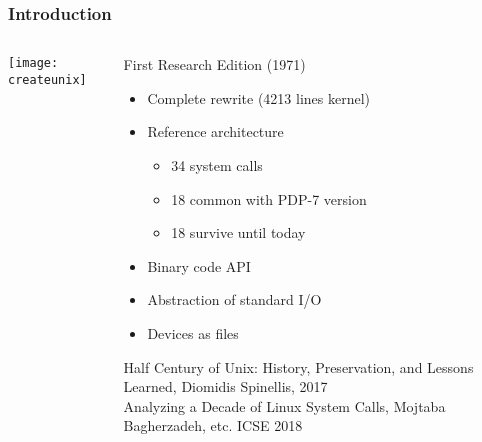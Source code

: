 \begin{frame}[plain]
	\frametitle{Introduction}
	
	
	
	\begin{columns}
		
		\begin{column}{.4\textwidth}
			
			\texttt{[image: createunix]}
			
		\end{column}
		
		\begin{column}{.6\textwidth}

		First Research Edition (1971)
		\begin{itemize}
			\item Complete rewrite (4213 lines kernel)
			\item Reference architecture
			
			\begin{itemize}
				\item 34 system calls
				\item 18 common with PDP-7 version
				\item 18 survive until today				
			\end{itemize}
			
			\item Binary code API
			\item Abstraction of standard I/O
			\item Devices as files
			
		\end{itemize}

	\begin{flushleft}
	\tiny Half Century of Unix:	History, Preservation, and	Lessons Learned, Diomidis Spinellis, 2017
	\\
	Analyzing a Decade of Linux System Calls, Mojtaba Bagherzadeh, etc. ICSE 2018
	
	
\end{flushleft}

		\end{column}
		
		
	\end{columns}
	

	
	
	
	
\end{frame}



